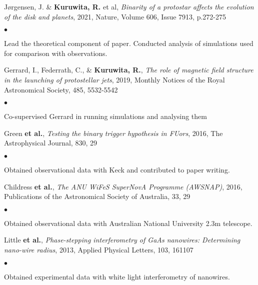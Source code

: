 \documentclass[margin,line]{res}
\newenvironment{list1}{
	\begin{list}{\ding{113}}{%
			\setlength{\itemsep}{0in}
			\setlength{\parsep}{0in} \setlength{\parskip}{0in}
			\setlength{\topsep}{0in} \setlength{\partopsep}{0in} 
			\setlength{\leftmargin}{0.17in}}}{\end{list}}
\newenvironment{list2}{
	\begin{list}{$\bullet$}{%
			\setlength{\itemsep}{0in}
			\setlength{\parsep}{0in} \setlength{\parskip}{0in}
			\setlength{\topsep}{0in} \setlength{\partopsep}{0in} 
			\setlength{\leftmargin}{0.2in}}}{\end{list}}
\begin{document}
\begin{resume}
\begin{list1}
 
	\item[]{J{\o}rgensen, J. \& {\bf Kuruwita, R.} et al}, \emph{Binarity of a protostar affects the evolution of the disk and planets}, 2021, Nature, Volume 606, Issue 7913, p.272-275
	\begin{list2}
		\item Lead the theoretical component of paper. Conducted analysis of simulations used for comparison with observations.\\
	\end{list2}
	\item[] Gerrard, I., Federrath, C., \&  {\bf Kuruwita, R.}, \emph{The role of magnetic field structure in the launching of protostellar jets}, 2019, Monthly Notices of the Royal Astronomical Society, 485, 5532-5542
	\begin{list2}
		\item Co-supervised Gerrard in running simulations and analysing them\\
	\end{list2}
	\item[] Green {\bf et al.}, \emph{Testing the binary trigger hypothesis in FUors}, 2016, The Astrophysical Journal, 830, 29
	\begin{list2}
		\item Obtained observational data with Keck and contributed to paper writing.\\
	\end{list2}
	\item[] Childress {\bf et al.}, \emph{The ANU WiFeS SuperNovA Programme (AWSNAP)}, 2016, Publications of the Astronomical Society of Australia, 33, 29
	\begin{list2}
		\item Obtained observational data with Australian National University 2.3m telescope.\\
	\end{list2}
	\item[] Little {\bf et al.}, \emph{Phase-stepping interferometry of GaAs nanowires: Determining nano-wire radius}, 2013, Applied Physical Letters, 103, 161107
	\begin{list2}
		\item Obtained experimental data with white light interferometry of nanowires.\\
	\end{list2}
\end{list1}
		
		

\end{resume}
\end{document}
